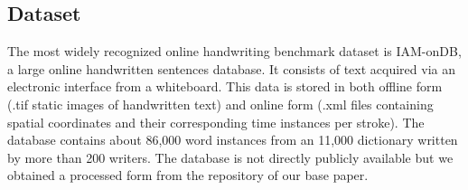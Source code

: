 \documentclass[10pt,twocolumn,letterpaper]{article}
\begin{document}
\subsection{Dataset}

The most widely recognized online handwriting benchmark dataset is IAM-onDB, a large online handwritten sentences database. It consists of text acquired via an electronic interface from a whiteboard. This data is stored in both offline form (.tif static images of handwritten text) and online form (.xml files containing spatial coordinates and their corresponding time instances per stroke). The database contains about 86,000 word instances from an 11,000 dictionary written by more than 200 writers. The database is not directly publicly available but we obtained a processed form from the repository of our base paper.
\end{document}
